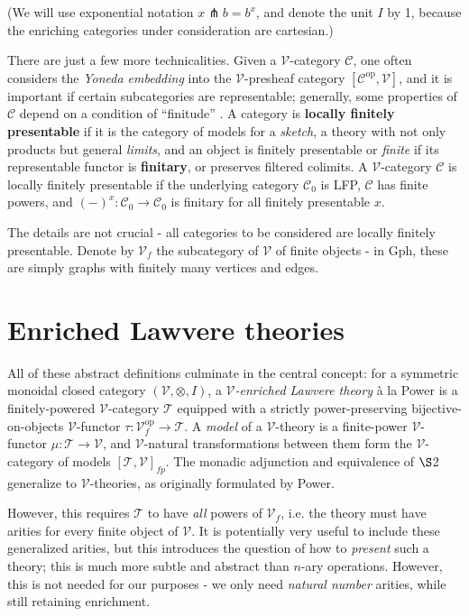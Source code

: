 \documentclass[a4paper,UKenglish]{article}
\theoremstyle{definition}
\newcommand{\Gph}{\mathrm{Gph}}
\newcommand{\op}{\mathrm{op}}
\newcommand{\V}{\mathscr{V}}
\newcommand{\C}{\mathscr{C}}
\newcommand{\T}{\mathscr{T}}
\newcommand{\pfk}{\pitchfork}
\begin{document}
(We will use exponential notation $x\pfk b = b^x$, and denote the unit $I$ by 1, because the enriching categories under consideration are cartesian.)

There are just a few more technicalities. Given a $\V$-category $\C$, one often considers the \textit{Yoneda embedding} into the $\V$-presheaf category $[\C^\op, \V]$, and it is important if certain subcategories are representable; generally, some properties of $\C$ depend on a condition of ``finitude'' \cite{finite}. A category is \textbf{locally finitely presentable} if it is the category of models for a \textit{sketch}, a theory with not only products but general \textit{limits}, and an object is finitely presentable or \textit{finite} if its representable functor is \textbf{finitary}, or preserves filtered colimits. A $\V$-category $\C$ is locally finitely presentable if the underlying category $\C_0$ is LFP, $\C$ has finite powers, and $(-)^x: \C_0 \to \C_0$ is finitary for all finitely presentable $x$.

The details are not crucial - all categories to be considered are locally finitely presentable. Denote by $\V_f$ the subcategory of $\V$ of finite objects - in $\Gph$, these are simply graphs with finitely many vertices and edges.

\section{Enriched Lawvere theories}
All of these abstract definitions culminate in the central concept: for a symmetric monoidal closed category $(\V,\otimes,I)$, a \textit{$\V$-enriched Lawvere theory} \`a la Power \cite{power} is a finitely-powered $\V$-category $\T$ equipped with a strictly power-preserving bijective-on-objects $\V$-functor $\tau:\V_f^\op \to \T$. A \textit{model} of a $\V$-theory is a finite-power $\V$-functor $\mu:\T \to \V$, and $\V$-natural transformations between them form the $\V$-category of models $[\T,\V]_{fp}$. The monadic adjunction and equivalence of $\S$2 generalize to $\V$-theories, as originally formulated by Power.

However, this requires $\T$ to have \textit{all} powers of $\V_f$, i.e. the theory must have arities for every finite object of $\V$. It is potentially very useful to include these generalized arities, but this introduces the question of how to \textit{present} such a theory; this is much more subtle and abstract than $n$-ary operations. However, this is not needed for our purposes - we only need \textit{natural number} arities, while still retaining enrichment.
\end{document}
